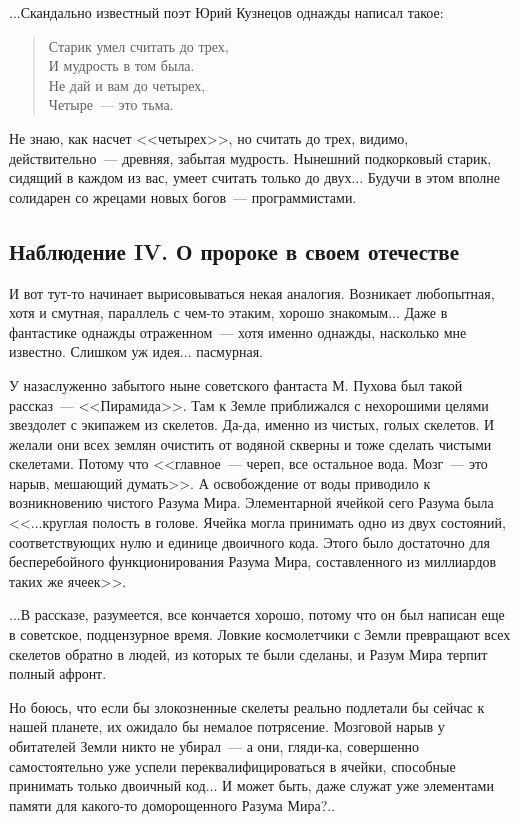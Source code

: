 \documentclass{scrbook}
\makeatletter
\newcommand{\flqq}{<<}
\newcommand{\frqq}{>>}
\newcommand{\mdash}{~--- }
\newcommand{\essaysection}[1]{\subsection*{#1}\nopagebreak}
\newcommand{\inlineauthor}[1]{\emph{#1}}
\newcommand{\myverse}[2][\empty]{
	\begin{verse}
	#2

	\ifx\@empty#1
	\else
		\nopagebreak
		\inlineauthor{#1}
	\fi
	\end{verse}
}
\makeatother
\begin{document}
...Скандально известный поэт Юрий Кузнецов однажды написал такое:

\myverse{
Старик умел считать до трех, \\
И мудрость в том была. \\
Не дай и вам до четырех, \\
Четыре{\mdash}это тьма.
}

Не знаю, как насчет {\flqq}четырех{\frqq}, но считать до трех, видимо, действительно{\mdash}древняя, забытая мудрость. Нынешний подкорковый старик, сидящий в каждом из вас, умеет считать только до двух... Будучи в этом вполне солидарен со жрецами новых богов{\mdash}программистами.

\essaysection{Наблюдение IV. О пророке в своем отечестве}

И вот тут-то начинает вырисовываться некая аналогия. Возникает любопытная, хотя и смутная, параллель с чем-то этаким, хорошо знакомым... Даже в фантастике однажды отраженном{\mdash}хотя именно однажды, насколько мне известно. Слишком уж идея... пасмурная.

У назаслуженно забытого ныне советского фантаста М. Пухова был такой рассказ{\mdash}{\flqq}Пирамида{\frqq}. Там к Земле приближался с нехорошими целями звездолет с экипажем из скелетов. Да-да, именно из чистых, голых скелетов. И желали они всех землян очистить от водяной скверны и тоже сделать чистыми скелетами. Потому что {\flqq}главное{\mdash}череп, все остальное вода. Мозг{\mdash}это нарыв, мешающий думать{\frqq}. А освобождение от воды приводило к возникновению чистого Разума Мира. Элементарной ячейкой сего Разума была {\flqq}...круглая полость в голове. Ячейка могла принимать одно из двух состояний, соответствующих нулю и единице двоичного кода. Этого было достаточно для бесперебойного функционирования Разума Мира, составленного из миллиардов таких же ячеек{\frqq}.

...В рассказе, разумеется, все кончается хорошо, потому что он был написан еще в советское, подцензурное время. Ловкие космолетчики с Земли превращают всех скелетов обратно в людей, из которых те были сделаны, и Разум Мира терпит полный афронт.

Но боюсь, что если бы злокозненные скелеты реально подлетали бы сейчас к нашей планете, их ожидало бы немалое потрясение. Мозговой нарыв у обитателей Земли никто не убирал{\mdash}а они, гляди-ка, совершенно самостоятельно уже успели переквалифицироваться в ячейки, способные принимать только двоичный код... И может быть, даже служат уже элементами памяти для какого-то доморощенного Разума Мира?..
\end{document}
